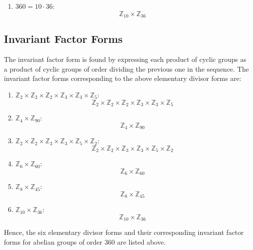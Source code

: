 \documentclass[12pt]{amsart}
\theoremstyle{definition}
\numberwithin{equation}{section}
\newcommand{\Z}{\mathbb{Z}}
\begin{document}
\begin{exercise}{1}
\begin{enumerate}
        \item \(360 = 10 \cdot 36\):
            \[
            \Z_{10} \times \Z_{36}
            \]
    \end{enumerate}

    \subsection*{Invariant Factor Forms}

    The invariant factor form is found by expressing each product of cyclic groups as a product of cyclic groups of order dividing the previous one in the sequence. The invariant factor forms corresponding to the above elementary divisor forms are:

    \begin{enumerate}
        \item \( \Z_2 \times \Z_2 \times \Z_2 \times \Z_3 \times \Z_3 \times \Z_5 \):
            \[
            \Z_2 \times \Z_2 \times \Z_2 \times \Z_3 \times \Z_3 \times \Z_5
            \]

        \item \( \Z_4 \times \Z_{90} \):
            \[
            \Z_4 \times \Z_{90}
            \]

        \item \( \Z_2 \times \Z_2 \times \Z_3 \times \Z_3 \times \Z_5 \times \Z_2 \):
            \[
            \Z_2 \times \Z_2 \times \Z_3 \times \Z_3 \times \Z_5 \times \Z_2
            \]

        \item \( \Z_6 \times \Z_{60} \):
            \[
            \Z_6 \times \Z_{60}
            \]

        \item \( \Z_8 \times \Z_{45} \):
            \[
            \Z_8 \times \Z_{45}
            \]

        \item \( \Z_{10} \times \Z_{36} \):
            \[
            \Z_{10} \times \Z_{36}
            \]
    \end{enumerate}

    Hence, the six elementary divisor forms and their corresponding invariant factor forms for abelian groups of order 360 are listed above.

\end{exercise}
\newpage
\end{document}
